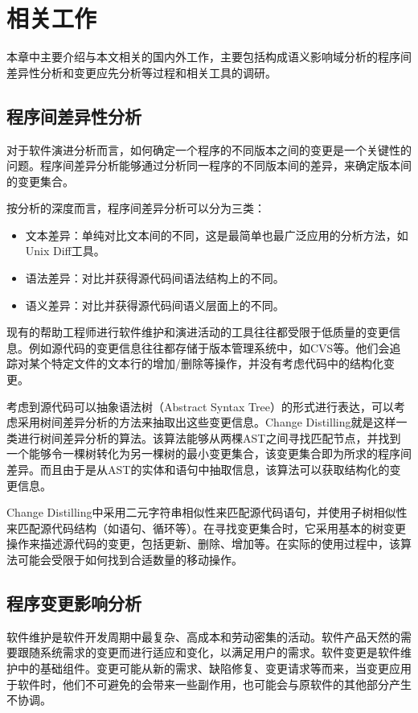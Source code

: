 \chapter{相关工作}

本章中主要介绍与本文相关的国内外工作，主要包括构成语义影响域分析的程序间差异性分析和变更应先分析等过程和相关工具的调研。
\section{程序间差异性分析}

对于软件演进分析而言，如何确定一个程序的不同版本之间的变更是一个关键性的问题\cite{kim2013identifying}。程序间差异分析能够通过分析同一程序的不同版本间的差异，来确定版本间的变更集合\cite{lahiri2010differential,winstead2003towards}。

按分析的深度而言，程序间差异分析可以分为三类：
\begin{itemize}
	\item 文本差异：单纯对比文本间的不同，这是最简单也最广泛应用的分析方法，如Unix Diff工具。
	\item 语法差异：对比并获得源代码间语法结构上的不同。
	\item 语义差异：对比并获得源代码间语义层面上的不同。
\end{itemize}

现有的帮助工程师进行软件维护和演进活动的工具往往都受限于低质量的变更信息。例如源代码的变更信息往往都存储于版本管理系统中，如CVS等。他们会追踪对某个特定文件的文本行的增加/删除等操作，并没有考虑代码中的结构化变更。

考虑到源代码可以抽象语法树（Abstract Syntax Tree）的形式进行表达，可以考虑采用树间差异分析的方法来抽取出这些变更信息。Change Distilling就是这样一类进行树间差异分析的算法\cite{fluri2007change,gall2009change}。该算法能够从两棵AST之间寻找匹配节点，并找到一个能够令一棵树转化为另一棵树的最小变更集合，该变更集合即为所求的程序间差异。而且由于是从AST的实体和语句中抽取信息，该算法可以获取结构化的变更信息。

Change Distilling中采用二元字符串相似性来匹配源代码语句，并使用子树相似性来匹配源代码结构（如语句、循环等）。在寻找变更集合时，它采用基本的树变更操作来描述源代码的变更，包括更新、删除、增加等。在实际的使用过程中，该算法可能会受限于如何找到合适数量的移动操作。

\section{程序变更影响分析}
软件维护是软件开发周期中最复杂、高成本和劳动密集的活动。软件产品天然的需要跟随系统需求的变更而进行适应和变化，以满足用户的需求。软件变更是软件维护中的基础组件。变更可能从新的需求、缺陷修复、变更请求等而来，当变更应用于软件时，他们不可避免的会带来一些副作用，也可能会与原软件的其他部分产生不协调。

